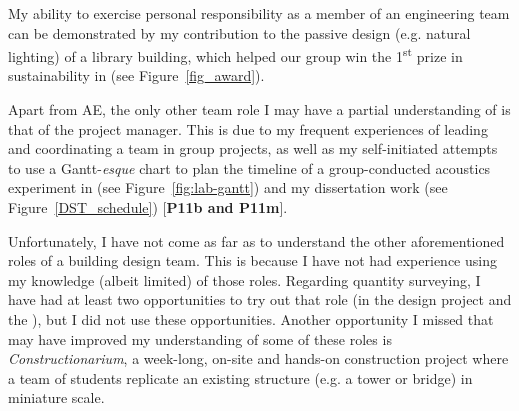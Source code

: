 My ability to exercise personal responsibility as a member of an engineering team can be demonstrated by my contribution to the passive design (e.g. natural lighting) of a library building, which helped our group win the 1\textsuperscript{st} prize in sustainability in \CASTitle \space (see Figure~\ref{fig_award}).

Apart from AE, the only other team role I may have a partial understanding of is that of the project manager.
This is due to my frequent experiences of leading and coordinating a team in group projects,
as well as my self-initiated attempts to use a Gantt-\textit{esque} chart to plan the timeline of a group-conducted acoustics experiment in \LABTitle \space (see Figure~\ref{fig:lab-gantt})
and
my dissertation work (see Figure~\ref{DST_schedule}) [\textbf{P11b and P11m}].

Unfortunately, I have not come as far as to understand the other aforementioned roles of a building design team.
This is because I have not had experience using my knowledge (albeit limited) of those roles.
Regarding quantity surveying, I have had at least two opportunities to try out that role (in the \CASTitle \space design project and the \PRJTitle), but I did not use these opportunities.
Another opportunity I missed that may have improved my understanding of some of these roles is \textit{Constructionarium}, a week-long, on-site and hands-on construction project where a team of students replicate an existing structure (e.g. a tower or bridge) in miniature scale.